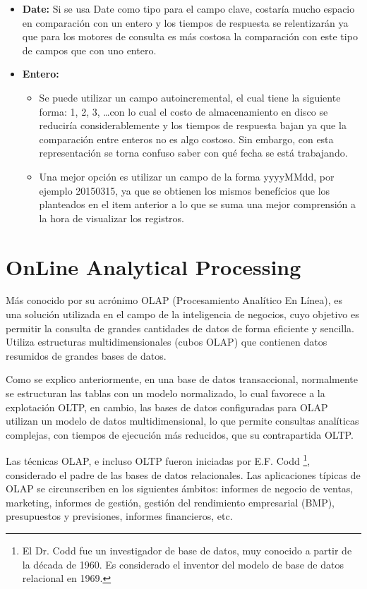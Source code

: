\documentclass[a4paper,11pt]{article}
\begin{document}
    \begin{itemize}
      \item \textbf{Date:} Si se usa Date como tipo para  el campo clave, costaría mucho espacio en comparación con un entero y los tiempos de respuesta se
      relentizarán ya que para los motores de consulta es más costosa la comparación con este tipo de campos que con uno entero.
      \item \textbf{Entero:}
      \begin{itemize}
        \item Se puede utilizar un campo autoincremental, el cual tiene la siguiente forma: 1, 2, 3, \dots con lo cual el costo de almacenamiento en disco
        se reduciría considerablemente y los tiempos de respuesta bajan ya que la comparación entre enteros no es algo costoso. Sin embargo, con esta representación se
        torna confuso saber con qué fecha se está trabajando.
        \item Una mejor opción es utilizar un campo de la forma yyyyMMdd, por ejemplo 20150315, ya que se obtienen los mismos benefícios que los planteados
        en el item anterior a lo que se suma una mejor comprensión a la hora de visualizar los registros.
      \end{itemize}
    \end{itemize}
    
    
    \section{OnLine Analytical Processing}
    
    Más conocido por su acrónimo OLAP (Procesamiento Analítico En Línea), es una solución utilizada en el campo de la inteligencia de negocios, cuyo 
    objetivo es permitir la consulta de grandes cantidades de datos de forma eficiente y sencilla. Utiliza estructuras multidimensionales (cubos OLAP) que 
    contienen datos resumidos de grandes bases de datos.
    
    Como se explico anteriormente, en una base de datos transaccional, normalmente se estructuran las tablas con un modelo normalizado, lo cual favorece a
    la explotación OLTP, en cambio, las bases de datos configuradas para OLAP utilizan un modelo de datos multidimensional, lo que permite consultas 
    analíticas complejas, con tiempos de ejecución más reducidos, que su contrapartida OLTP.

    Las técnicas OLAP, e incluso OLTP fueron iniciadas por E.F. Codd \footnote{El Dr. Codd fue un investigador de base de datos, muy conocido a partir de la
    década de 1960. Es considerado el inventor del modelo de base de datos relacional en 1969.}, considerado el padre de las bases de datos
    relacionales. Las aplicaciones típicas de OLAP se circunscriben en los siguientes ámbitos: informes de negocio de ventas, marketing, informes de gestión,
    gestión del rendimiento empresarial (BMP), presupuestos y previsiones, informes financieros, etc.
    
\end{document}
